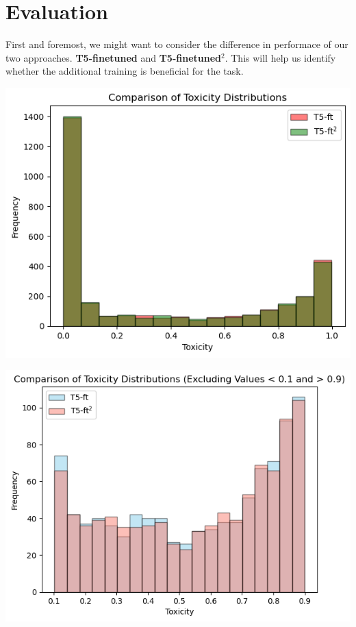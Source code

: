 \section{Evaluation}
First and foremost, we might want to consider the difference in performace of
our two approaches. \textbf{T5-finetuned} and \textbf{T5-finetuned\(^2\)}. This
will help us identify whether the additional training is beneficial for the
task.

\begin{minipage}{\linewidth}
    \includegraphics[scale=0.35]{figures/final/t5-52-toxicity.png}%
    \label{fig:eval:toxdistrt52}%
\end{minipage}

\begin{minipage}{0.9\linewidth}
    \includegraphics[scale=0.35]{figures/final/t5-52-tox-limited.png}%
    \label{fig:eval:toxdistrlimt52}%
\end{minipage}

